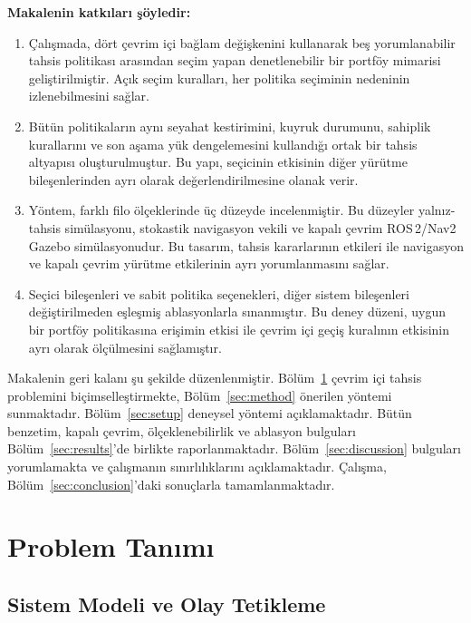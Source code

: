 \documentclass[10pt,letterpaper,onecolumn]{IEEEtran}
\begin{document}
\textbf{Makalenin katkıları şöyledir:}
\begin{enumerate}
  \item Çalışmada, dört çevrim içi bağlam değişkenini kullanarak beş
  yorumlanabilir tahsis politikası arasından seçim yapan denetlenebilir bir
  portföy mimarisi geliştirilmiştir. Açık seçim kuralları, her politika
  seçiminin nedeninin izlenebilmesini sağlar.

  \item Bütün politikaların aynı seyahat kestirimini, kuyruk durumunu, sahiplik
  kurallarını ve son aşama yük dengelemesini kullandığı ortak bir tahsis
  altyapısı oluşturulmuştur. Bu yapı, seçicinin etkisinin diğer yürütme
  bileşenlerinden ayrı olarak değerlendirilmesine olanak verir.

  \item Yöntem, farklı filo ölçeklerinde üç düzeyde incelenmiştir. Bu düzeyler
  yalnız-tahsis simülasyonu, stokastik navigasyon vekili ve kapalı çevrim
  ROS\,2/Nav2 Gazebo simülasyonudur. Bu tasarım, tahsis kararlarının etkileri ile
  navigasyon ve kapalı çevrim yürütme etkilerinin ayrı yorumlanmasını sağlar.

  \item Seçici bileşenleri ve sabit politika seçenekleri, diğer sistem
  bileşenleri değiştirilmeden eşleşmiş ablasyonlarla sınanmıştır. Bu deney
  düzeni, uygun bir portföy politikasına erişimin etkisi ile çevrim içi geçiş
  kuralının etkisinin ayrı olarak ölçülmesini sağlamıştır.
\end{enumerate}

Makalenin geri kalanı şu şekilde düzenlenmiştir.
Bölüm~\ref{sec:problem} çevrim içi tahsis problemini
biçimselleştirmekte, Bölüm~\ref{sec:method} önerilen yöntemi sunmaktadır.
Bölüm~\ref{sec:setup} deneysel yöntemi açıklamaktadır. Bütün benzetim, kapalı
çevrim, ölçeklenebilirlik ve ablasyon bulguları Bölüm~\ref{sec:results}'de
birlikte raporlanmaktadır. Bölüm~\ref{sec:discussion} bulguları yorumlamakta ve
çalışmanın sınırlılıklarını açıklamaktadır. Çalışma,
Bölüm~\ref{sec:conclusion}'daki sonuçlarla tamamlanmaktadır.

\section{Problem Tanımı}
\label{sec:problem}

\subsection{Sistem Modeli ve Olay Tetikleme}
\end{document}
